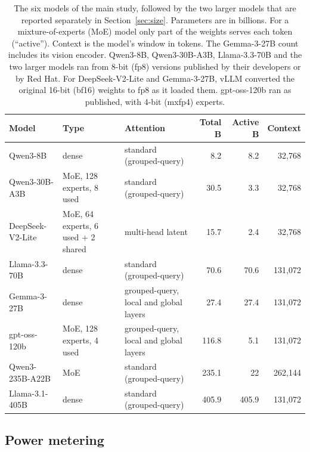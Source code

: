 \documentclass[11pt]{article}
\begin{document}
\begin{table}[t]
\centering\small
\caption{The six models of the main study, followed by the two larger models that are reported separately in Section~\ref{sec:size}. Parameters are in billions. For a mixture-of-experts (MoE) model only part of the weights serves each token (``active''). Context is the model's window in tokens. The Gemma-3-27B count includes its vision encoder. Qwen3-8B, Qwen3-30B-A3B, Llama-3.3-70B and the two larger models ran from 8-bit (fp8) versions published by their developers or by Red Hat. For DeepSeek-V2-Lite and Gemma-3-27B, vLLM converted the original 16-bit (bf16) weights to fp8 as it loaded them. gpt-oss-120b ran as published, with 4-bit (mxfp4) experts.}\label{tab:models}
\scriptsize
\setlength{\tabcolsep}{3pt}
\begin{tabular}{@{}lllrrr@{}}
\toprule
Model & Type & Attention & Total B & Active B & Context \\
\midrule
Qwen3-8B & dense & standard (grouped-query) & 8.2 & 8.2 & 32,768 \\
Qwen3-30B-A3B & MoE, 128 experts, 8 used & standard (grouped-query) & 30.5 & 3.3 & 32,768 \\
DeepSeek-V2-Lite & MoE, 64 experts, 6 used + 2 shared & multi-head latent & 15.7 & 2.4 & 32,768 \\
Llama-3.3-70B & dense & standard (grouped-query) & 70.6 & 70.6 & 131,072 \\
Gemma-3-27B & dense & grouped-query, local and global layers & 27.4 & 27.4 & 131,072 \\
gpt-oss-120b & MoE, 128 experts, 4 used & grouped-query, local and global layers & 116.8 & 5.1 & 131,072 \\
\midrule
Qwen3-235B-A22B & MoE & standard (grouped-query) & 235.1 & 22\phantom{.0} & 262,144 \\
Llama-3.1-405B & dense & standard (grouped-query) & 405.9 & 405.9 & 131,072 \\
\bottomrule
\end{tabular}
\end{table}

\subsection{Power metering}\label{sec:power}
\end{document}
